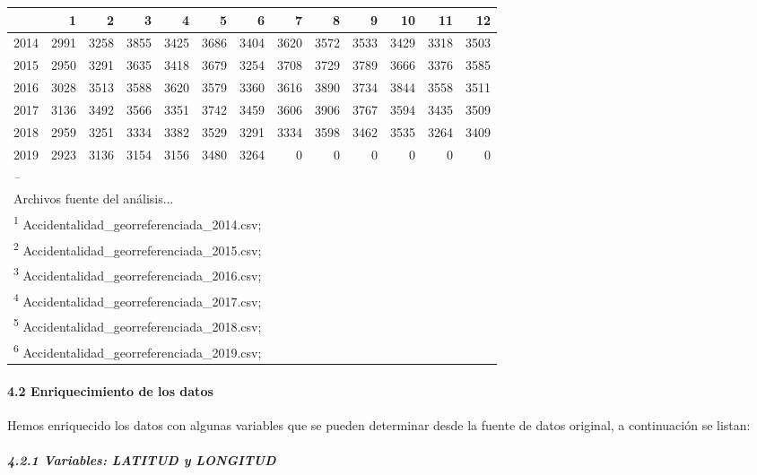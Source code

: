 \documentclass[]{article}
\let\oldparagraph\paragraph
\renewcommand{\paragraph}[1]{\oldparagraph{#1}\mbox{}}
\let\oldsubparagraph\subparagraph
\renewcommand{\subparagraph}[1]{\oldsubparagraph{#1}\mbox{}}
\begin{document}
\begin{tabular}{l|r|r|r|r|r|r|r|r|r|r|r|r}
\hline
  & 1 & 2 & 3 & 4 & 5 & 6 & 7 & 8 & 9 & 10 & 11 & 12\\
\hline
2014 & 2991 & 3258 & 3855 & 3425 & 3686 & 3404 & 3620 & 3572 & 3533 & 3429 & 3318 & 3503\\
\hline
2015 & 2950 & 3291 & 3635 & 3418 & 3679 & 3254 & 3708 & 3729 & 3789 & 3666 & 3376 & 3585\\
\hline
2016 & 3028 & 3513 & 3588 & 3620 & 3579 & 3360 & 3616 & 3890 & 3734 & 3844 & 3558 & 3511\\
\hline
2017 & 3136 & 3492 & 3566 & 3351 & 3742 & 3459 & 3606 & 3906 & 3767 & 3594 & 3435 & 3509\\
\hline
2018 & 2959 & 3251 & 3334 & 3382 & 3529 & 3291 & 3334 & 3598 & 3462 & 3535 & 3264 & 3409\\
\hline
2019 & 2923 & 3136 & 3154 & 3156 & 3480 & 3264 & 0 & 0 & 0 & 0 & 0 & 0\\
\hline
\multicolumn{13}{l}{\textit{--}}\\
\multicolumn{13}{l}{Archivos fuente del análisis...}\\
\multicolumn{13}{l}{\textsuperscript{1} Accidentalidad\_georreferenciada\_2014.csv; }\\
\multicolumn{13}{l}{\textsuperscript{2} Accidentalidad\_georreferenciada\_2015.csv; }\\
\multicolumn{13}{l}{\textsuperscript{3} Accidentalidad\_georreferenciada\_2016.csv; }\\
\multicolumn{13}{l}{\textsuperscript{4} Accidentalidad\_georreferenciada\_2017.csv; }\\
\multicolumn{13}{l}{\textsuperscript{5} Accidentalidad\_georreferenciada\_2018.csv; }\\
\multicolumn{13}{l}{\textsuperscript{6} Accidentalidad\_georreferenciada\_2019.csv; }\\
\end{tabular}
\endgroup{}

\hypertarget{enriquecimiento-de-los-datos}{%
\paragraph{4.2 Enriquecimiento de los
datos}\label{enriquecimiento-de-los-datos}}

Hemos enriquecido los datos con algunas variables que se pueden
determinar desde la fuente de datos original, a continuación se listan:

\hypertarget{variables-latitud-y-longitud}{%
\subparagraph{4.2.1 Variables: LATITUD y
LONGITUD}\label{variables-latitud-y-longitud}}
\end{document}
